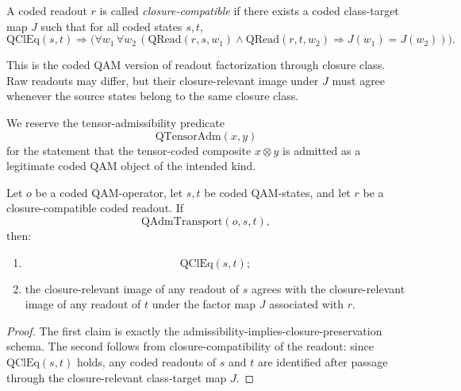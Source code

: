 \begin{definition}
A coded readout $r$ is called \emph{closure-compatible} if there exists a coded class-target map $J$ such that for all coded states $s,t$,
\[
\mathrm{QClEq}(s,t)\Longrightarrow
\bigl(
\forall w_1\,\forall w_2\,
(\mathrm{QRead}(r,s,w_1)\wedge \mathrm{QRead}(r,t,w_2)\Longrightarrow J(w_1)=J(w_2))
\bigr).
\]
\end{definition}

\begin{remark}
This is the coded QAM version of readout factorization through closure class. Raw readouts may differ, but their closure-relevant image under $J$ must agree whenever the source states belong to the same closure class.
\end{remark}

\begin{definition}
We reserve the tensor-admissibility predicate
\[
\mathrm{QTensorAdm}(x,y)
\]
for the statement that the tensor-coded composite $x\otimes y$ is admitted as a legitimate coded QAM object of the intended kind.
\end{definition}

\begin{proposition}
Let $o$ be a coded QAM-operator, let $s,t$ be coded QAM-states, and let $r$ be a closure-compatible coded readout. If
\[
\mathrm{QAdmTransport}(o,s,t),
\]
then:
\begin{enumerate}
\item \[
\mathrm{QClEq}(s,t);
\]
\item the closure-relevant image of any readout of $s$ agrees with the closure-relevant image of any readout of $t$ under the factor map $J$ associated with $r$.
\end{enumerate}
\end{proposition}

\begin{proof}
The first claim is exactly the admissibility-implies-closure-preservation schema. The second follows from closure-compatibility of the readout: since $\mathrm{QClEq}(s,t)$ holds, any coded readouts of $s$ and $t$ are identified after passage through the closure-relevant class-target map $J$.
\end{proof}


